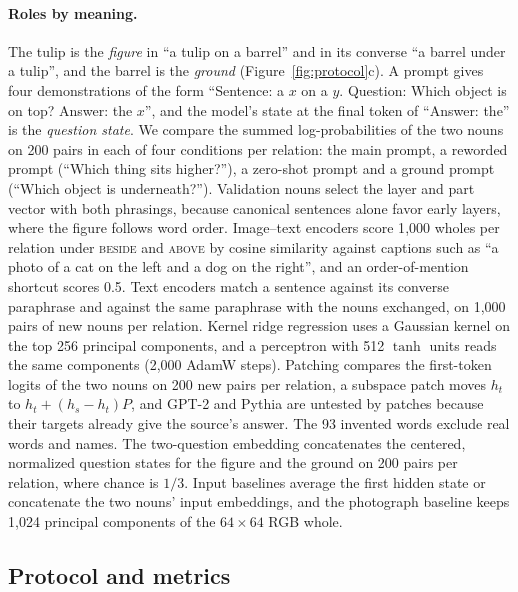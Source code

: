 \paragraph{Roles by meaning.} The tulip is the \emph{figure} in ``a tulip on a barrel'' and in its converse ``a barrel under a tulip'', and the barrel is the \emph{ground} (Figure~\ref{fig:protocol}c). A prompt gives four demonstrations of the form ``Sentence: a $x$ on a $y$. Question: Which object is on top? Answer: the $x$'', and the model's state at the final token of ``Answer: the'' is the \emph{question state}. We compare the summed log-probabilities of the two nouns on 200 pairs in each of four conditions per relation: the main prompt, a reworded prompt (``Which thing sits higher?''), a zero-shot prompt and a ground prompt (``Which object is underneath?''). Validation nouns select the layer and part vector with both phrasings, because canonical sentences alone favor early layers, where the figure follows word order. Image--text encoders score 1{,}000 wholes per relation under \textsc{beside} and \textsc{above} by cosine similarity against captions such as ``a photo of a cat on the left and a dog on the right'', and an order-of-mention shortcut scores 0.5. Text encoders match a sentence against its converse paraphrase and against the same paraphrase with the nouns exchanged, on 1{,}000 pairs of new nouns per relation. Kernel ridge regression uses a Gaussian kernel on the top 256 principal components, and a perceptron with 512 $\tanh$ units reads the same components (2{,}000 AdamW steps). Patching compares the first-token logits of the two nouns on 200 new pairs per relation, a subspace patch moves $h_t$ to $h_t + (h_s - h_t) P$, and GPT-2 and Pythia are untested by patches because their targets already give the source's answer. The 93 invented words exclude real words and names. The two-question embedding concatenates the centered, normalized question states for the figure and the ground on 200 pairs per relation, where chance is $1/3$. Input baselines average the first hidden state or concatenate the two nouns' input embeddings, and the photograph baseline keeps 1{,}024 principal components of the $64 \times 64$ RGB whole.

\subsection{Protocol and metrics}
\label{app:metrics}

